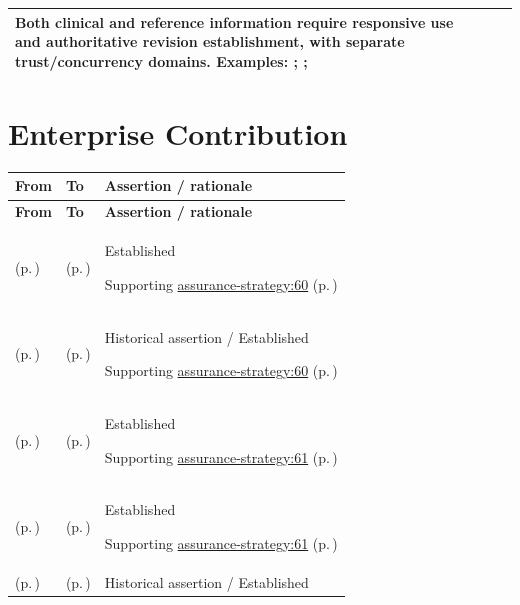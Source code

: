 \begin{longtable}{|>{\raggedright\arraybackslash}p{0.27\TableWidth}|>{\raggedright\arraybackslash}p{0.27\TableWidth}|>{\raggedright\arraybackslash}p{0.46\TableWidth}|}
Both clinical and reference information require responsive use and authoritative revision establishment, with separate trust/concurrency domains. Examples: \nameref{feature:governed-dataset-content-revision}; \nameref{function:accept-governed-dataset-revision}; \nameref{service:governed-reference-dataset-content-query}\\\hline
\end{longtable}\endgroup
\section{Enterprise Contribution}
\begingroup\small\setlength{\TableWidth}{\dimexpr\linewidth-6\tabcolsep-4\arrayrulewidth\relax}
\begin{longtable}{|>{\raggedright\arraybackslash}p{0.27\TableWidth}|>{\raggedright\arraybackslash}p{0.27\TableWidth}|>{\raggedright\arraybackslash}p{0.46\TableWidth}|}
\hline\rowcolor{TableHead}\textbf{From} & \textbf{To} & \textbf{Assertion / rationale}\\\hline\endfirsthead
\hline\rowcolor{TableHead}\textbf{From} & \textbf{To} & \textbf{Assertion / rationale}\\\hline\endhead
\hline\endfoot
\nameref{cap:bec-assurance-design} (p.\,\pageref{cap:bec-assurance-design}) & \nameref{cap:ec-01} (p.\,\pageref{cap:ec-01}) & Established

Supporting \hyperref[rad:assurance-strategy:58]{assurance-strategy:60} (p.\,\pageref{rad:assurance-strategy:58})\\\hline
\nameref{cap:bec-governed-assurance} (p.\,\pageref{cap:bec-governed-assurance}) & \nameref{cap:ec-01} (p.\,\pageref{cap:ec-01}) & Historical assertion / Established

Supporting \hyperref[rad:assurance-strategy:58]{assurance-strategy:60} (p.\,\pageref{rad:assurance-strategy:58})\\\hline
\nameref{cap:bec-assurance-design} (p.\,\pageref{cap:bec-assurance-design}) & \nameref{cap:ec-02} (p.\,\pageref{cap:ec-02}) & Established

Supporting \hyperref[rad:assurance-strategy:58]{assurance-strategy:61} (p.\,\pageref{rad:assurance-strategy:58})\\\hline
\nameref{cap:bec-assurance-criteria-management} (p.\,\pageref{cap:bec-assurance-criteria-management}) & \nameref{cap:ec-02} (p.\,\pageref{cap:ec-02}) & Established

Supporting \hyperref[rad:assurance-strategy:58]{assurance-strategy:61} (p.\,\pageref{rad:assurance-strategy:58})\\\hline
\nameref{cap:bec-governed-assurance} (p.\,\pageref{cap:bec-governed-assurance}) & \nameref{cap:ec-02} (p.\,\pageref{cap:ec-02}) & Historical assertion / Established


\end{longtable}
